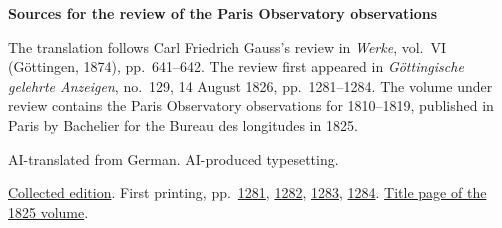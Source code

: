 \clearpage\thispagestyle{empty}
\begin{center}\Large\bfseries Sources for the review of the Paris Observatory observations\end{center}

The translation follows Carl Friedrich Gauss’s review in \emph{Werke}, vol.~VI (Göttingen, 1874), pp.~641--642. The review first appeared in \emph{Göttingische gelehrte Anzeigen}, no.~129, 14 August 1826, pp.~1281--1284. The volume under review contains the Paris Observatory observations for 1810--1819, published in Paris by Bachelier for the Bureau des longitudes in 1825.

AI-translated from German. AI-produced typesetting.

\href{https://gdz.sub.uni-goettingen.de/id/PPN236007467}{Collected edition}. First printing, pp.~\href{https://images.p.sub.uni-goettingen.de/iiif/image/gdz:PPN385030444_1826_2:00000603/full/1650,/0/default.jpg}{1281}, \href{https://images.p.sub.uni-goettingen.de/iiif/image/gdz:PPN385030444_1826_2:00000604/full/1650,/0/default.jpg}{1282}, \href{https://images.p.sub.uni-goettingen.de/iiif/image/gdz:PPN385030444_1826_2:00000605/full/1650,/0/default.jpg}{1283}, \href{https://images.p.sub.uni-goettingen.de/iiif/image/gdz:PPN385030444_1826_2:00000606/full/1650,/0/default.jpg}{1284}. \href{https://books.google.nl/books?id=7G5YAAAAcAAJ&pg=PR3}{Title page of the 1825 volume}.

\clearpage
